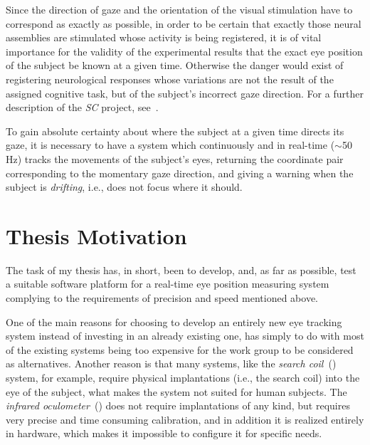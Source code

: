Since the direction of gaze and the orientation of the visual
stimulation have to correspond as exactly as possible, in order to be
certain that exactly those neural assemblies are stimulated whose
activity is being registered, it is of vital importance for the
validity of the experimental results that the exact eye position of
the subject be known at a given time.  Otherwise the danger would
exist of registering neurological responses whose variations are not
the result of the assigned cognitive task, but of the subject's
incorrect gaze direction.  For a further description of the {\em SC\/}
project, see~\cite{antrag}.

To gain absolute certainty about where the subject at a given time
directs its gaze, it is necessary to have a system which continuously
and in real-time ($\sim$50 Hz) tracks the movements of the subject's
eyes, returning the coordinate pair corresponding to the momentary 
gaze direction, and giving a warning when the subject is {\em
  drifting\/}, i.e., does not focus where it should.

\section{Thesis Motivation}
\label{intro:motivation}

The task of my thesis has, in short, been to develop, and, as far as
possible, test a suitable software platform for a real-time eye
position measuring system complying to the requirements of precision
and speed mentioned above.

One of the main reasons for choosing to develop an entirely new eye
tracking system instead of investing in an already existing one, has
simply to do with most of the existing systems being too expensive for
the work group to be considered as alternatives.  Another reason is
that many systems, like the {\em search coil\/}~(\cite{coil}) system,
for example, require physical implantations (i.e., the search coil)
into the eye of the subject, what makes the system not suited for
human subjects.  The {\em infrared oculometer\/}~(\cite{infrared})
does not require implantations of any kind, but requires very precise
and time consuming calibration, and in addition it is realized
entirely in hardware, which makes it impossible to configure it for
specific needs.


